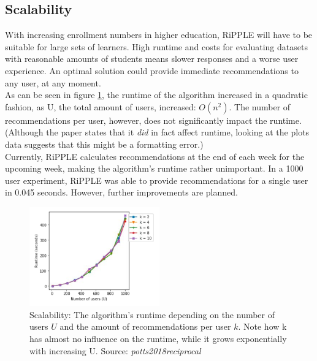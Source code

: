 \documentclass[nochapterpage,bigchapter,linedtoc,longdoc,colorback,accentcolor=tud3b,oneside]{tudreport}
\begin{document}
\subsection{Scalability} \label{paper:scalability}
With increasing enrollment numbers in higher education, RiPPLE will have to be suitable for large sets of learners. High runtime and costs for evaluating datasets with reasonable amounts of students means slower responses and a worse user experience. An optimal solution could provide immediate recommendations to any user, at any moment.\\
As can be seen in figure \ref{f:scalability}, the runtime of the algorithm increased in a quadratic fashion, as U, the total amount of users, increased: \(O(n^2)\). The number of recommendations per user, however, does not significantly impact the runtime. (Although the paper states that it \textit{did} in fact affect runtime, looking at the plots data suggests that this might be a formatting error.)\\
Currently, RiPPLE calculates recommendations at the end of each week for the upcoming week, making the algorithm's runtime rather unimportant. In a 1000 user experiment, RiPPLE was able to provide recommendations for a single user in 0.045 seconds. However, further improvements are planned.\\
\begin{figure}[p]
	\centering
	\includegraphics[width=0.5\textwidth]{g/Runtime.PNG}
	\caption{Scalability: The algorithm's runtime depending on the number of users \(U\) and the amount of recommendations per user \(k\). Note how k has almost no influence on the runtime, while it grows exponentially with increasing U. Source: \textit{potts2018reciprocal}}
	\label{f:scalability}
\end{figure}
\end{document}

